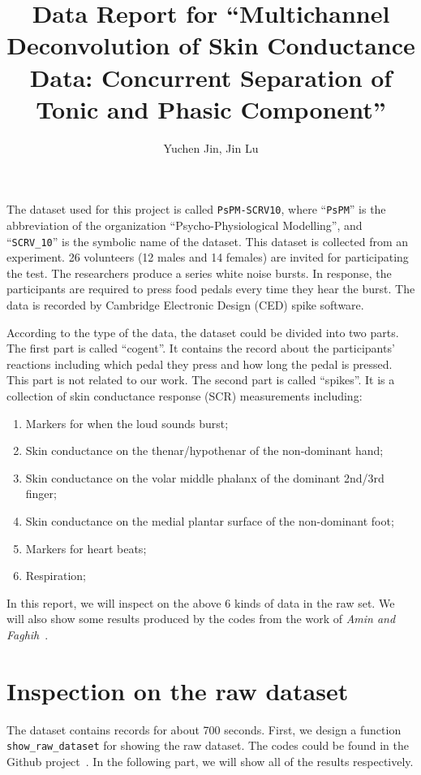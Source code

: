 \documentclass[]{article}
\title{Data Report for ``Multichannel Deconvolution of Skin Conductance Data: Concurrent Separation of Tonic and Phasic Component''}
\author{Yuchen Jin, Jin Lu}
\begin{document}
\maketitle

The dataset used for this project is called \texttt{PsPM-SCRV10}\cite{bach2014pspm}, where ``\texttt{PsPM}'' is the abbreviation of the organization ``Psycho-Physiological Modelling'', and ``\texttt{SCRV\_10}'' is the symbolic name of the dataset. This dataset is collected from an experiment. 26 volunteers (12 males and 14 females) are invited for participating the test. The researchers produce a series white noise bursts. In response, the participants are required to press food pedals every time they hear the burst. The data is recorded by Cambridge Electronic Design (CED) spike software.

According to the type of the data, the dataset could be divided into two parts. The first part is called ``cogent''. It contains the record about the participants' reactions including which pedal they press and how long the pedal is pressed. This part is not related to our work. The second part is called ``spikes''. It is a collection of skin conductance response (SCR) measurements including:

\begin{enumerate}
  \item Markers for when the loud sounds burst;
  \item Skin conductance on the thenar/hypothenar of the non-dominant hand;
  \item Skin conductance on the volar middle phalanx of the dominant 2nd/3rd finger;
  \item Skin conductance on the medial plantar surface of the non-dominant foot;
  \item Markers for heart beats;
  \item Respiration;
\end{enumerate}

In this report, we will inspect on the above 6 kinds of data in the raw set. We will also show some results produced by the codes from the work of \textit{Amin and Faghih}~\cite{amin2019robust}.

\section{Inspection on the raw dataset}

The dataset contains records for about 700 seconds. First, we design a function \texttt{show\_raw\_dataset} for showing the raw dataset. The codes could be found in the Github project~\cite{jin2020}. In the following part, we will show all of the results respectively.
\end{document}
